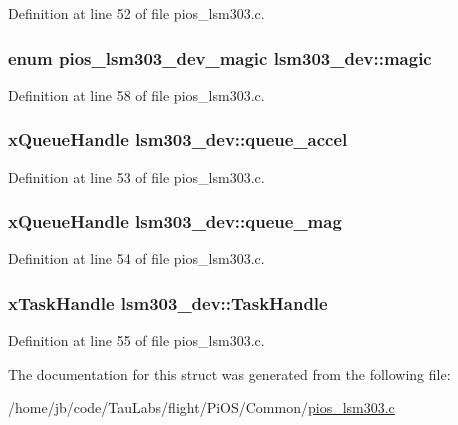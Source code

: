 \-Definition at line 52 of file pios\-\_\-lsm303.\-c.

\hypertarget{structlsm303__dev_a70f59374a7f9e9a6297167795f5b8bdf}{
\subsubsection[{magic}]{\setlength{\rightskip}{0pt plus 5cm}enum {\bf pios\-\_\-lsm303\-\_\-dev\-\_\-magic} {\bf lsm303\-\_\-dev\-::magic}}}\label{structlsm303__dev_a70f59374a7f9e9a6297167795f5b8bdf}


\-Definition at line 58 of file pios\-\_\-lsm303.\-c.

\hypertarget{structlsm303__dev_aadc09417d06ef07b4f4eb39b74f947a0}{
\subsubsection[{queue\-\_\-accel}]{\setlength{\rightskip}{0pt plus 5cm}x\-Queue\-Handle {\bf lsm303\-\_\-dev\-::queue\-\_\-accel}}}\label{structlsm303__dev_aadc09417d06ef07b4f4eb39b74f947a0}


\-Definition at line 53 of file pios\-\_\-lsm303.\-c.

\hypertarget{structlsm303__dev_a4801df95b04cdb58185c818dca8ae4ef}{
\subsubsection[{queue\-\_\-mag}]{\setlength{\rightskip}{0pt plus 5cm}x\-Queue\-Handle {\bf lsm303\-\_\-dev\-::queue\-\_\-mag}}}\label{structlsm303__dev_a4801df95b04cdb58185c818dca8ae4ef}


\-Definition at line 54 of file pios\-\_\-lsm303.\-c.

\hypertarget{structlsm303__dev_aa53f45353583c54556c8fd920144726a}{
\subsubsection[{\-Task\-Handle}]{\setlength{\rightskip}{0pt plus 5cm}x\-Task\-Handle {\bf lsm303\-\_\-dev\-::\-Task\-Handle}}}\label{structlsm303__dev_aa53f45353583c54556c8fd920144726a}


\-Definition at line 55 of file pios\-\_\-lsm303.\-c.



\-The documentation for this struct was generated from the following file\-:\begin{DoxyCompactItemize}
\item 
/home/jb/code/\-Tau\-Labs/flight/\-Pi\-O\-S/\-Common/\hyperlink{pios__lsm303_8c}{pios\-\_\-lsm303.\-c}\end{DoxyCompactItemize}

